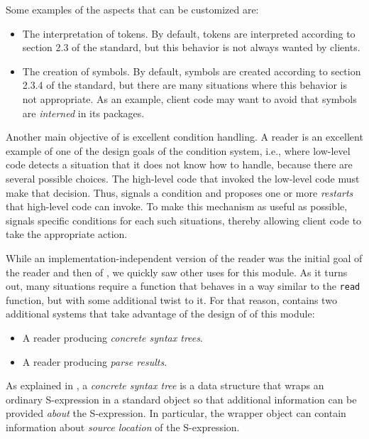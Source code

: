 Some examples of the aspects that can be customized are:

\begin{itemize}
\item The interpretation of tokens.  By default, tokens are
  interpreted according to section 2.3 of the \commonlisp{} standard,
  but this behavior is not always wanted by clients.
\item The creation of symbols.  By default, symbols are created
  according to section 2.3.4 of the \commonlisp{} standard, but there
  are many situations where this behavior is not appropriate.  As an
  example, client code may want to avoid that symbols are
  \emph{interned} in its packages.
\end{itemize}

Another main objective of \eclector{} is excellent condition
handling.  A \commonlisp{} reader is an excellent example of one of
the design goals of the \commonlisp{} condition system, i.e., where
low-level code detects a situation that it does not know how to
handle, because there are several possible choices.  The high-level
code that invoked the low-level code must make that decision.  Thus,
\eclector{} signals a condition and proposes one or more
\emph{restarts} that high-level code can invoke.  To make this
mechanism as useful as possible, \eclector{} signals specific
conditions for each such situations, thereby allowing client code to
take the appropriate action.

While an implementation-independent version of the \commonlisp{}
reader was the initial goal of the \sysname{} reader and then of
\eclector{}, we quickly saw other uses for this module.  As it turns
out, many situations require a function that behaves in a way similar
to the \commonlisp{} \texttt{read} function, but with some additional
twist to it.  For that reason, \eclector{} contains two additional
systems that take advantage of the design of of this module:

\begin{itemize}
\item A reader producing \emph{concrete syntax trees}.
\item A reader producing \emph{parse results}.
\end{itemize}

As explained in , a \emph{concrete
  syntax tree} is a data structure that wraps an ordinary S-expression
in a standard object so that additional information can be provided
\emph{about} the S-expression.  In particular, the wrapper object can
contain information about \emph{source location} of the S-expression.

